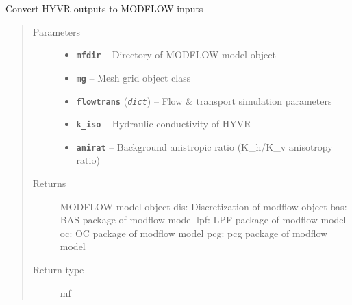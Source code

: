 \documentclass[letterpaper,10pt,english]{sphinxmanual}
\begin{document}
\begin{fulllineitems}
\label{hyvr:hyvr.hyvr.utils.to_modflow}
Convert HYVR outputs to MODFLOW inputs
\begin{quote}\begin{description}
\item[{Parameters}] \leavevmode\begin{itemize}
\item {} 
\textbf{\texttt{mfdir}} -- Directory of MODFLOW model object

\item {} 
\textbf{\texttt{mg}} -- Mesh grid object class

\item {} 
\textbf{\texttt{flowtrans}} (\emph{\texttt{dict}}) -- Flow \& transport simulation parameters

\item {} 
\textbf{\texttt{k\_iso}} -- Hydraulic conductivity of HYVR

\item {} 
\textbf{\texttt{anirat}} -- Background anistropic ratio (K\_h/K\_v anisotropy ratio)

\end{itemize}

\item[{Returns}] \leavevmode
MODFLOW model object
dis:                            Discretization of modflow object
bas:                            BAS package of modflow model
lpf:                            LPF package of modflow model
oc:                                     OC package of modflow model
pcg:                            pcg package of modflow model

\item[{Return type}] \leavevmode
mf

\end{description}\end{quote}

\end{fulllineitems}

\end{document}
